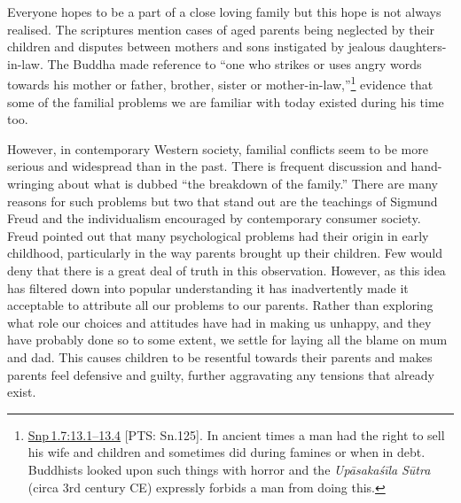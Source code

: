 \documentclass[10pt, openright]{book}
\begin{document}
Everyone hopes to be a part of a close loving family but this hope is not always realised. The scriptures mention cases of aged parents being neglected by their children and disputes between mothers and sons instigated by jealous daughters-in-law. The Buddha made reference to “one who strikes or uses angry words towards his mother or father, brother, sister or mother-in-law,”\footnote {\href{https://suttacentral.net/snp1.7/en/sujato\#13.1}{Snp 1.7:13.1–13.4} [PTS: Sn.125]. In ancient times a man had the right to sell his wife and children and sometimes did during famines or when in debt. Buddhists looked upon such things with horror and the \textit{Upāsakaśīla} \textit{Sūtra} (circa 3rd century CE) expressly forbids a man from doing this.} evidence that some of the familial problems we are familiar with today existed during his time too.


However, in contemporary Western society, familial conflicts seem to be more serious and widespread than in the past. There is frequent discussion and hand-wringing about what is dubbed “the breakdown of the family.” There are many reasons for such problems but two that stand out are the teachings of Sigmund Freud and the individualism encouraged by contemporary consumer society. Freud pointed out that many psychological problems had their origin in early childhood, particularly in the way parents brought up their children. Few would deny that there is a great deal of truth in this observation. However, as this idea has filtered down into popular understanding it has inadvertently made it acceptable to attribute all our problems to our parents. Rather than exploring what role our choices and attitudes have had in making us unhappy, and they have probably done so to some extent, we settle for laying all the blame on mum and dad. This causes children to be resentful towards their parents and makes parents feel defensive and guilty, further aggravating any tensions that already exist.
\end{document}
